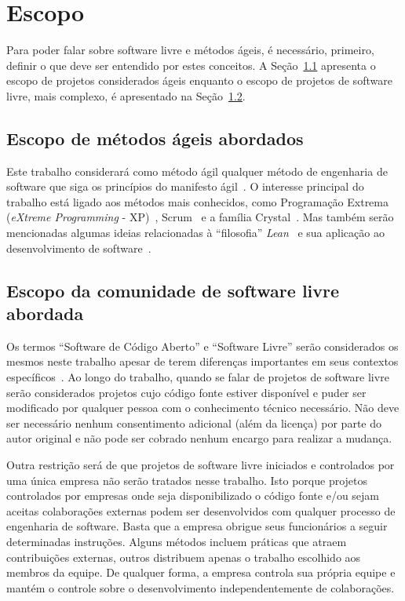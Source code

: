 \chapter{Escopo}
\label{cap:escopo}

Para poder falar sobre software livre e métodos ágeis, é necessário,
primeiro, definir o que deve ser entendido por estes conceitos. A
Seção~\ref{sec:agile-def} apresenta o escopo de projetos considerados
ágeis enquanto o escopo de projetos de software livre, mais
complexo, é apresentado na Seção~\ref{sec:os-def}.


\section{Escopo de métodos ágeis abordados}
\label{sec:agile-def}

Este trabalho considerará como método ágil qualquer método de
engenharia de software que siga os princípios do manifesto
ágil~\cite{AgileManifesto}. O interesse principal do trabalho está
ligado aos métodos mais conhecidos, como Programação Extrema
(\emph{eXtreme Programming} - XP)~\cite{XP02},
Scrum~\cite{Schwaber2004} e a família Crystal~\cite{Cockburn2002}. Mas
também serão mencionadas algumas ideias relacionadas à ``filosofia''
\emph{Lean}~\cite{Ohno1998} e sua aplicação ao desenvolvimento de
software~\cite{Poppendieck2005}.

\section{Escopo da comunidade de software livre abordada}
\label{sec:os-def}

Os termos ``Software de Código Aberto'' e ``Software Livre'' serão
considerados os mesmos neste trabalho apesar de terem diferenças
importantes em seus contextos específicos~\cite[Ch. 1, Free Versus
Open source]{Fogel2005}. Ao longo do trabalho, quando se falar de
projetos de software livre serão considerados projetos cujo código
fonte estiver disponível e puder ser modificado por qualquer pessoa
com o conhecimento técnico necessário. Não deve ser necessário nenhum
consentimento adicional (além da licença) por parte do autor original
e não pode ser cobrado nenhum encargo para realizar a mudança.

Outra restrição será de que projetos de software livre iniciados e
controlados por uma única empresa não serão tratados nesse
trabalho. Isto porque projetos controlados por empresas onde seja
disponibilizado o código fonte e/ou sejam aceitas colaborações
externas podem ser desenvolvidos com qualquer processo de engenharia
de software. Basta que a empresa obrigue seus funcionários a seguir
determinadas instruções. Alguns métodos incluem práticas que atraem
contribuições externas, outros distribuem apenas o trabalho escolhido
aos membros da equipe. De qualquer forma, a empresa controla sua
própria equipe e mantém o controle sobre o desenvolvimento
independentemente de colaborações.

